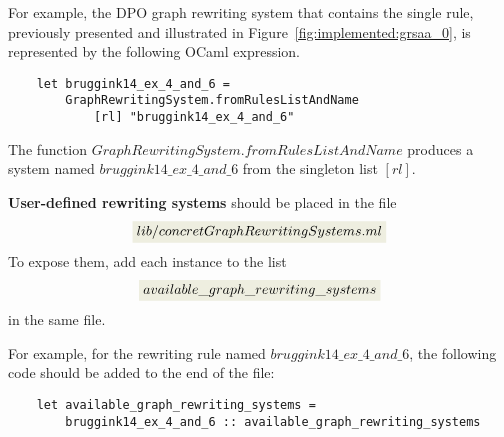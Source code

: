 For example, the DPO graph rewriting system that contains the single rule, previously presented and illustrated in Figure~\ref{fig:implemented:grsaa_0}, is represented by the following OCaml expression. 
\begin{verbatim}
    let bruggink14_ex_4_and_6 =
        GraphRewritingSystem.fromRulesListAndName 
            [rl] "bruggink14_ex_4_and_6"
\end{verbatim}
The function \colorbox{Ivory2}{$GraphRewritingSystem.fromRulesListAndName$} produces a system named \colorbox{Ivory2}{$bruggink14\_ex\_4\_and\_6$} from the singleton list \colorbox{Ivory2}{$[rl]$}.


\textbf{User-defined rewriting systems} should be placed in the file 
    $$\colorbox{Ivory2}{$lib/concretGraphRewritingSystems.ml$}$$
 To expose them, add each instance to the list 
 $$\colorbox{Ivory2}{$available\_graph\_rewriting\_systems$}$$ in the same file.

For example, for the rewriting rule named \colorbox{Ivory2}{$bruggink14\_ex\_4\_and\_6$}, the following code should be added to the end of the file:
\begin{verbatim}
    let available_graph_rewriting_systems = 
        bruggink14_ex_4_and_6 :: available_graph_rewriting_systems 
\end{verbatim}

